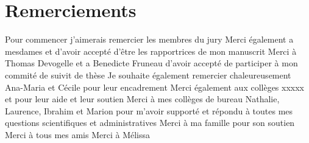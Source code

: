 \section*{Remerciements}

Pour commencer j'aimerais remercier les membres du jury
%
Merci également a mesdames  et 
d'avoir accepté d'être les rapportrices de mon manuscrit
%
Merci à Thomas Devogelle et a Benedicte Fruneau d'avoir accepté de
participer à mon commité de suivit de thèse
%
Je souhaite également remercier chaleureusement Ana-Maria et Cécile
pour leur encadrement
%
Merci également aux collèges xxxxx et pour leur aide et leur soutien
%
Merci à mes collèges de bureau Nathalie, Laurence, Ibrahim et Marion
pour m'avoir supporté et répondu à toutes mes questions scientifiques
et administratives
%
Merci à ma famille pour son soutien
%
Merci à tous mes amis
%
Merci à Mélissa